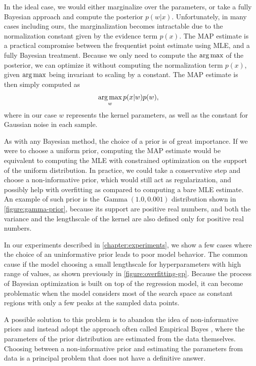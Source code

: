 In the ideal case, we would either marginalize over the parameters, or take a fully Bayesian approach and compute the posterior $p(w | x)$. Unfortunately, in many cases including ours, the marginalization becomes intractable due to the normalization constant given by the evidence term $p(x)$. The MAP estimate is a practical compromise between the frequentist point estimate using MLE, and a fully Bayesian treatment. Because we only need to compute the $\operatorname*{arg\,max}$ of the posterior, we can optimize it without computing the normalization term $p(x)$, given $\operatorname*{arg\,max}$ being invariant to scaling by a constant. The MAP estimate is then simply computed as $$ \operatorname*{arg\,max}_w p(x|w) p(w), $$ where in our case $w$ represents the kernel parameters, as well as the constant for Gaussian noise in each sample.

As with any Bayesian method, the choice of a prior is of great importance. If we were to choose a uniform prior, computing the MAP estimate would be equivalent to computing the MLE with constrained optimization on the support of the uniform distribution. In practice, we could take a conservative step and choose a non-informative prior, which would still act as regularization, and possibly help with overfitting as compared to computing a bare MLE estimate. An example of such prior is the $\operatorname{Gamma}(1.0, 0.001)$ distribution shown in \autoref{figure:gamma-prior}, because its support are positive real numbers, and both the variance and the lengthscale of the kernel are also defined only for positive real numbers.

In our experiments described in \autoref{chapter:experiments}, we show a few cases where the choice of an uninformative prior leads to poor model behavior. The common cause if the model choosing a small lengthscale for hyperparameters with high range of values, as shown previously in \autoref{figure:overfitting-gp}. Because the process of Bayesian optimization is built on top of the regression model, it can become problematic when the model considers most of the search space as constant regions with only a few peaks at the sampled data points.

A possible solution to this problem is to abandon the idea of non-informative priors and instead adopt the approach often called Empirical Bayes \citep{murphy2012machine}, where the parameters of the prior distribution are estimated from the data themselves. Choosing between a non-informative prior and estimating the parameters from data is a principal problem that does not have a definitive answer.

